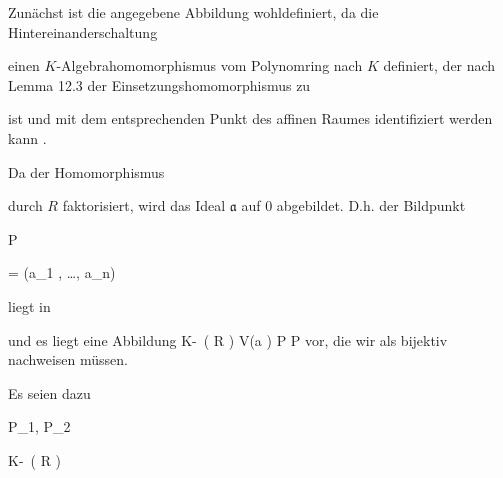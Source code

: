 {


Zunächst ist die angegebene Abbildung wohldefiniert, da die Hintereinanderschaltung


 {  }


einen $K$-Algebrahomomorphismus vom Polynomring nach $K$ definiert, der nach
Lemma 12.3
der Einsetzungshomomorphismus zu

 ist und mit dem entsprechenden Punkt des affinen Raumes identifiziert werden kann
 {} {.}


Da der Homomorphismus

 durch $R$ faktorisiert, wird das Ideal ${\mathfrak a}$ auf $0$ abgebildet. D.h. der Bildpunkt


\mavergleichskette

{\vergleichskette

{ P \circ \varphi
}

{ = }{ (a_1 , \ldots , a_n)
}

{  }{
}

{    }{
}

{   }{
}

}
{}{}{}
liegt in

 und es liegt eine Abbildung
\maabbeledisp {} { K\!-\!\, \left(   R   \right) } { V({\mathfrak a} ) 
} { P } { P \circ \varphi
} {}
vor, die wir als bijektiv nachweisen müssen.


Es seien dazu


\mavergleichskette

{\vergleichskette

{ P_1, P_2
}

{ \in }{ K\!-\!\, \left(  R  \right)
}

{  }{
}

}}
